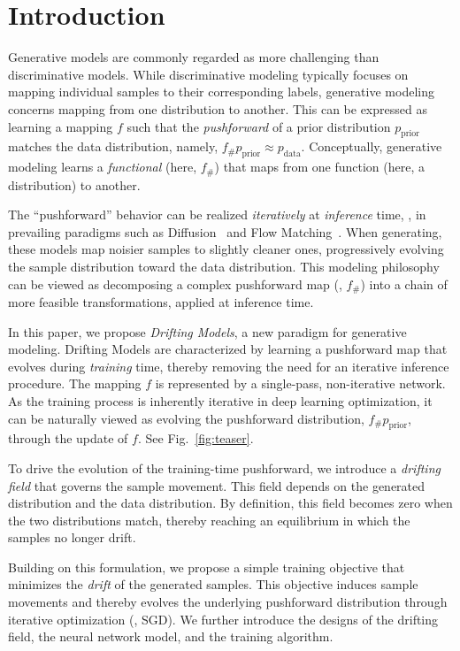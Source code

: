 \section{Introduction}

Generative models are commonly regarded as more challenging than discriminative models.
While discriminative modeling typically focuses on mapping individual samples to their corresponding labels, generative modeling concerns mapping from one distribution to another.
This can be expressed as learning a mapping $f$ such that the \mbox{\textit{pushforward}} of a prior distribution $p_\text{prior}$ matches the data distribution, namely, $f_\# p_\text{prior} \approx p_{\text{data}}$.
Conceptually, generative modeling learns a \textit{functional} (here, $f_\#$) that maps from one function (here, a distribution) to another.

The ``pushforward'' behavior can be realized \textit{iteratively} at \textit{inference} time, \eg, in prevailing paradigms such as Diffusion~\cite{sohl2015deep} and Flow Matching~\cite{lipman2022flow}. When generating, these models map noisier samples to slightly cleaner ones, progressively evolving the sample distribution toward the data distribution.
This modeling philosophy can be viewed as decomposing a complex pushforward map (\ie, $f_\#$) into a chain of more feasible transformations, applied at inference time.

In this paper, we propose \emph{Drifting Models}, a new paradigm for generative
modeling. Drifting Models are characterized by learning a pushforward map that evolves during \textit{training} time, thereby removing the need for an iterative inference procedure. The mapping $f$ is represented by a single-pass, non-iterative network. As the training process is inherently iterative in deep learning optimization, it can be naturally viewed as evolving the pushforward
distribution, $f_\# p_\text{prior}$, through the update of $f$. See Fig.~\ref{fig:teaser}.

To drive the evolution of the training-time pushforward, we introduce a
\emph{drifting field} that governs the sample movement.
This field depends on the generated distribution and the data distribution.
By definition, this field becomes zero when the two distributions match, thereby reaching an equilibrium in which the samples no longer drift.

Building on this formulation, we propose a simple training objective that minimizes the \textit{drift} of the generated samples. This objective induces sample movements and thereby evolves the underlying pushforward distribution through iterative optimization (\eg, SGD). We further introduce the designs of the drifting field, the neural network model, and the training algorithm.

